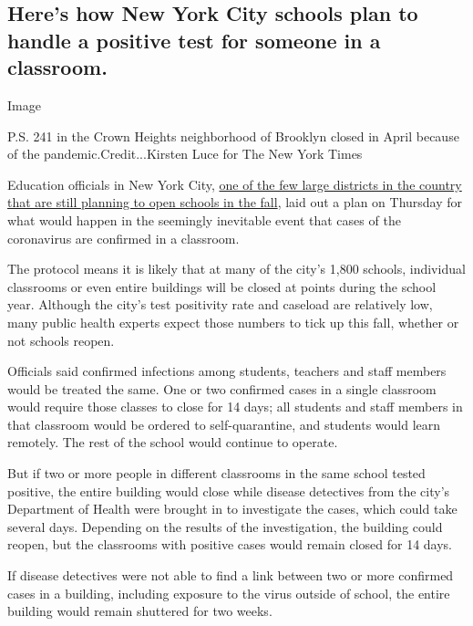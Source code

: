 \hypertarget{heres-how-new-york-city-schools-plan-to-handle-a-positive-test-for-someone-in-a-classroom}{%
\subsection{Here's how New York City schools plan to handle a positive
test for someone in a
classroom.}\label{heres-how-new-york-city-schools-plan-to-handle-a-positive-test-for-someone-in-a-classroom}}

Image

P.S. 241 in the Crown Heights neighborhood of Brooklyn closed in April
because of the pandemic.Credit...Kirsten Luce for The New York Times

Education officials in New York City,
\href{https://www.nytimes3xbfgragh.onion/2020/07/14/us/coronavirus-schools-fall.html}{one
of the few large districts in the country that are still planning to
open schools in the fall}, laid out a plan on Thursday for what would
happen in the seemingly inevitable event that cases of the coronavirus
are confirmed in a classroom.

The protocol means it is likely that at many of the city's 1,800
schools, individual classrooms or even entire buildings will be closed
at points during the school year. Although the city's test positivity
rate and caseload are relatively low, many public health experts expect
those numbers to tick up this fall, whether or not schools reopen.

Officials said confirmed infections among students, teachers and staff
members would be treated the same. One or two confirmed cases in a
single classroom would require those classes to close for 14 days; all
students and staff members in that classroom would be ordered to
self-quarantine, and students would learn remotely. The rest of the
school would continue to operate.

But if two or more people in different classrooms in the same school
tested positive, the entire building would close while disease
detectives from the city's Department of Health were brought in to
investigate the cases, which could take several days. Depending on the
results of the investigation, the building could reopen, but the
classrooms with positive cases would remain closed for 14 days.

If disease detectives were not able to find a link between two or more
confirmed cases in a building, including exposure to the virus outside
of school, the entire building would remain shuttered for two weeks.

